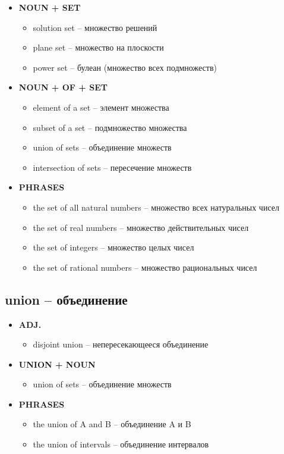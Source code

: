\documentclass[a4paper, 10pt]{article}
\theoremstyle{definition}
\theoremstyle{plain}
\theoremstyle{remark}
\begin{document}
\begin{itemize}
    \item \textbf{NOUN + SET}
    \begin{itemize}
        \item solution set – множество решений
        \item plane set – множество на плоскости
        \item power set – булеан (множество всех подмножеств)
    \end{itemize}
    
    \item \textbf{NOUN + OF + SET}
    \begin{itemize}
        \item element of a set – элемент множества
        \item subset of a set – подмножество множества
        \item union of sets – объединение множеств
        \item intersection of sets – пересечение множеств
    \end{itemize}
    
    \item \textbf{PHRASES}
    \begin{itemize}
        \item the set of all natural numbers – множество всех натуральных чисел
        \item the set of real numbers – множество действительных чисел
        \item the set of integers – множество целых чисел
        \item the set of rational numbers – множество рациональных чисел
    \end{itemize}
\end{itemize}

\subsection{union – объединение}

\begin{itemize}
    \item \textbf{ADJ.}
    \begin{itemize}
        \item disjoint union – непересекающееся объединение
    \end{itemize}
    
    \item \textbf{UNION + NOUN}
    \begin{itemize}
        \item union of sets – объединение множеств
    \end{itemize}
    
    \item \textbf{PHRASES}
    \begin{itemize}
        \item the union of A and B – объединение A и B
        \item the union of intervals – объединение интервалов
    \end{itemize}
\end{itemize}
\end{document}
